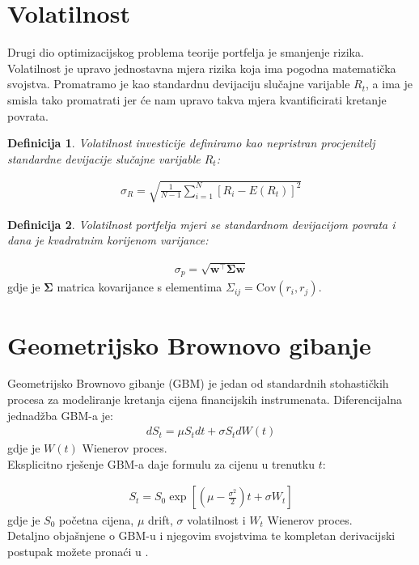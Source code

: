 \documentclass[zavrsnirad]{fer}
\newtheorem{definition}{Definicija}
\begin{document}
\section{Volatilnost}
Drugi dio optimizacijskog problema teorije portfelja je smanjenje rizika.
Volatilnost je upravo jednostavna mjera rizika koja ima pogodna matematička svojstva.
Promatramo je kao standardnu devijaciju slučajne varijable $R_t$, a ima je smisla tako promatrati
jer će nam upravo takva mjera kvantificirati kretanje povrata.
\begin{definition}
	Volatilnost investicije definiramo kao nepristran procjenitelj
	standardne devijacije slučajne varijable $R_t$:
\end{definition}
\begin{align*}
	\sigma_R = \sqrt{\frac{1}{N - 1} \sum_{i = 1}^{N} \left[R_i - E(R_t)\right]^2}
\end{align*}
\begin{definition}
Volatilnost portfelja mjeri se standardnom devijacijom povrata i dana je kvadratnim korijenom varijance:
\end{definition}
\begin{align*}
\sigma_p = \sqrt{\mathbf{w}^\intercal \boldsymbol{\Sigma} \mathbf{w}}
\end{align*}
\indent gdje je $\boldsymbol{\Sigma}$ matrica kovarijance s elementima $\Sigma_{ij} = \text{Cov}(r_i, r_j)$.

\section{Geometrijsko Brownovo gibanje}
\label{sek:gbm}
Geometrijsko Brownovo gibanje (GBM) je jedan od standardnih
stohastičkih procesa za modeliranje kretanja cijena financijskih instrumenata.
Diferencijalna jednadžba GBM-a je:
\begin{align*}
    dS_t = \mu S_t dt + \sigma S_t dW\left(t\right)
\end{align*}
\indent gdje je $W\left(t\right)$ Wienerov proces.\\
Eksplicitno rješenje GBM-a daje formulu za cijenu u trenutku $t$:

\begin{align*}
S_t = S_0 \exp\left[\left(\mu - \frac{\sigma^2}{2}\right)t +
    \sigma W_t\right]
\end{align*}
\indent gdje je $S_0$ početna cijena, $\mu$ drift, $\sigma$ volatilnost i $W_t$
Wienerov proces.\\
Detaljno objašnjene o GBM-u i njegovim svojstvima te kompletan derivacijski
postupak možete pronaći u \cite{GMBIzvod}.
\end{document}
